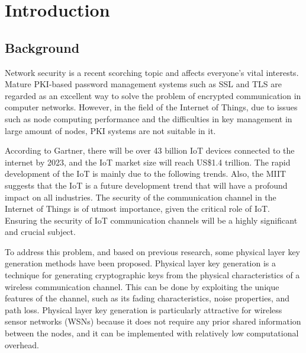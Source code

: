 
\chapter{Introduction}

\section{Background}

Network security is a recent scorching topic and affects everyone's vital interests. Mature PKI-based password management systems such as SSL and TLS are regarded as an excellent way to solve the problem of encrypted communication in computer networks. However, in the field of the Internet of Things, due to issues such as node computing performance and the difficulties in key management in large amount of nodes, PKI systems are not suitable in it. 

According to Gartner\cite{gartnerresearchiot}, there will be over 43 billion IoT devices connected to the internet by 2023, and the IoT market size will reach US\$1.4 trillion. The rapid development of the IoT is mainly due to the following trends. Also, the MIIT suggests that the IoT is a future development trend that will have a profound impact on all industries\cite{iot13th5yr}. The security of the communication channel in the Internet of Things is of utmost importance, given the critical role of IoT. Ensuring the security of IoT communication channels will be a highly significant and crucial subject.

To address this problem, and based on previous research, some physical layer key generation methods have been proposed. Physical layer key generation is a technique for generating cryptographic keys from the physical characteristics of a wireless communication channel. This can be done by exploiting the unique features of the channel, such as its fading characteristics, noise properties, and path loss. Physical layer key generation is particularly attractive for wireless sensor networks (WSNs) because it does not require any prior shared information between the nodes, and it can be implemented with relatively low computational overhead.

